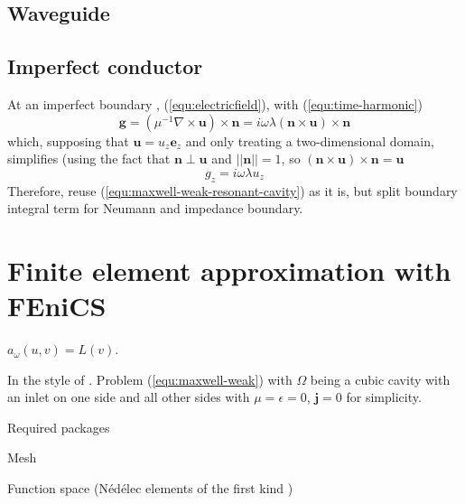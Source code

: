 \documentclass[11pt, a4paper]{article}
\begin{document}
\subsection{Waveguide}
\label{subsec:waveguide}


\subsection{Imperfect conductor}
\label{subsec:impedance}

At an imperfect boundary \cite{monk}, (\ref{equ:electricfield}), with (\ref{equ:time-harmonic})
\begin{equation}
    \mathbf{g} = (\mu^{-1} \nabla \times \mathbf{u}) \times \mathbf{n}
    = i \omega \lambda (\mathbf{n} \times \mathbf{u}) \times \mathbf{n}
\end{equation}
which, supposing that $\mathbf{u} = u_z \mathbf{e}_z$ and only treating a
two-dimensional domain, simplifies (using the fact that $\mathbf{n} \perp \mathbf{u}$
and $||\mathbf{n}|| = 1$, so $(\mathbf{n} \times \mathbf{u}) \times \mathbf{n} = \mathbf{u}$
\begin{equation}
    g_z = i \omega \lambda u_z
\end{equation}
Therefore, reuse (\ref{equ:maxwell-weak-resonant-cavity}) as it is, but split 
boundary integral term for Neumann and impedance boundary.


\pagebreak
\section{Finite element approximation with FEniCS}
\label{sec:fem}


$a_{\omega}(u, v) = L(v)$.

In the style of \cite{fenics}. 
Problem (\ref{equ:maxwell-weak}) with $\Omega$ being a cubic cavity with an inlet
on one side and all other sides with $\mu = \epsilon = 0$, $\mathbf{j} = 0$
for simplicity.

Required packages


Mesh


Function space (Nédélec elements of the first kind \cite{monk})

\end{document}
